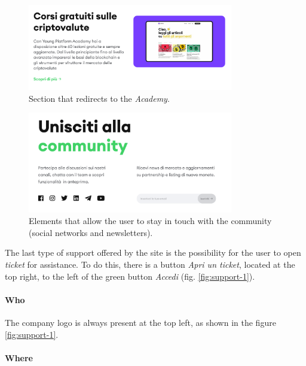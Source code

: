 \begin{figure}[H]
  \centering
  \includegraphics[width=0.80\textwidth]{res/images/internal-pages/support/support-5.png}
  \caption{Section that redirects to the \textit{Academy}.}
  \label{fig:support-5}
\end{figure}

\begin{figure}[H]
  \centering
  \includegraphics[width=0.80\textwidth]{res/images/internal-pages/support/support-6.png}
  \caption{Elements that allow the user to stay in touch with the 
  community (social networks and newsletters).}
  \label{fig:support-6}
\end{figure}

The last type of support offered by the site is the possibility for the 
user to open \textit{ticket} for assistance. To do this, there is a 
button \textit{Apri un ticket}, located at the top right, to the left of 
the green button \textit{Accedi} (fig. \ref{fig:support-1}). 

\paragraph{Who}

The company logo is always present at the top left, as shown in the figure 
\ref{fig:support-1}.

\paragraph{Where}

